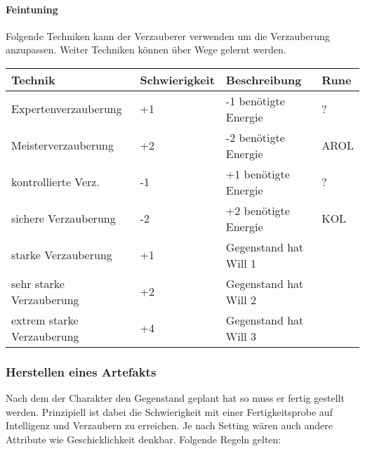 \documentclass{article}
\begin{document}
\paragraph{Feintuning}

Folgende Techniken kann der Verzauberer verwenden um die Verzauberung anzupassen. Weiter Techniken können über Wege
gelernt werden.


\begin{small}
\begin{tabular}{|m{4cm}|m{3cm}|m{4cm}|m{2cm}|}
\hline
\textbf{Technik}&\textbf{Schwierigkeit}&\textbf{Beschreibung}&\textbf{Rune}\\
\hline
\hline
Expertenverzauberung&+1&-1 benötigte Energie&?\\
\hline
Meisterverzauberung&+2&-2 benötigte Energie&AROL\\
\hline
kontrollierte Verz.&-1&+1 benötigte Energie&?\\
\hline
sichere Verzauberung&-2&+2 benötigte Energie&KOL\\
\hline
starke Verzauberung&+1&Gegenstand hat Will 1&\\
\hline
sehr starke Verzauberung&+2&Gegenstand hat Will 2&\\
\hline
extrem starke Verzauberung&+4&Gegenstand hat Will 3&\\
\hline
\end{tabular}
\end{small}

\subsubsection{Herstellen eines Artefakts}

Nach dem der Charakter den Gegenstand geplant hat so muss er fertig gestellt werden. Prinzipiell ist dabei die
Schwierigkeit mit einer Fertigkeitsprobe auf Intelligenz und Verzaubern zu erreichen. Je nach Setting wären auch
andere Attribute wie Geschicklichkeit denkbar. Folgende Regeln gelten:
\end{document}

